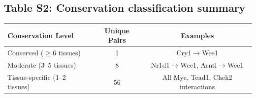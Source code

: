 \documentclass[11pt,letterpaper]{article}
\begin{document}
\subsection*{Table S2: Conservation classification summary}

\begin{table}[H]
\centering
\begin{tabular}{lcc}
\toprule
\textbf{Conservation Level} & \textbf{Unique Pairs} & \textbf{Examples} \\
\midrule
Conserved ($\geq$6 tissues) & 1 & Cry1$\rightarrow$Wee1 \\
Moderate (3--5 tissues) & 8 & Nr1d1$\rightarrow$Wee1, Arntl$\rightarrow$Wee1 \\
Tissue-specific (1--2 tissues) & 56 & All Myc, Tead1, Chek2 interactions \\
\bottomrule
\end{tabular}
\end{table}
\end{document}
